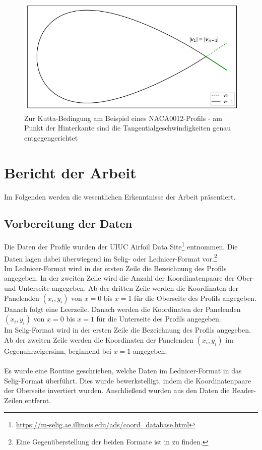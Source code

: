 \begin{figure}
\begin{center} \includegraphics[scale=0.7]{figures/kutta.png} \end{center}
\caption{Zur Kutta-Bedingung am Beispiel eines NACA0012-Profils - am Punkt der Hinterkante sind die Tangentialgeschwindigkeiten genau entgegengerichtet}
\label{fig:kutta}
\end{figure}
\cite{Hess:1966} \cite{Cebeci:1999} \cite{Alonso:2005}

\newpage
\chapter{Bericht der Arbeit}
Im Folgenden werden die wesentlichen Erkenntnisse der Arbeit präsentiert.
\section{Vorbereitung der Daten}
Die Daten der Profile wurden der UIUC Airfoil Data Site\footnote{\url{https://m-selig.ae.illinois.edu/ads/coord_database.html}} entnommen. Die Daten lagen dabei überwiegend im Selig- oder Lednicer-Format vor.\footnote{Eine Gegenüberstellung der beiden Formate ist in  zu finden.}
\\
Im Lednicer-Format wird in der ersten Zeile die Bezeichnung des Profils angegeben. In der zweiten Zeile wird die Anzahl der Koordinatenpaare der Ober- und Unterseite angegeben. Ab der dritten Zeile werden die Koordinaten der Panelenden $(x_i,y_i)$ von $x=0$ bis $x=1$ für die Oberseite des Profils angegeben. Danach folgt eine Leerzeile. Danach werden die Koordinaten der Panelenden $(x_i,y_i)$ von $x=0$ bis $x=1$ für die Unterseite des Profils angegeben.
\\
Im Selig-Format wird in der ersten Zeile die Bezeichnung des Profils angegeben. Ab der zweiten Zeile werden die Koordinaten der Panelenden $(x_i,y_i)$ im Gegenuhrzeigersinn, beginnend bei $x=1$ angegeben.
\\\\
Es wurde eine Routine geschrieben, welche Daten im Lednicer-Format in das Selig-Format überführt. Dies wurde bewerkstelligt, indem die Koordinatenpaare der Oberseite invertiert wurden. Anschließend wurden aus den Daten die Header-Zeilen entfernt. 
